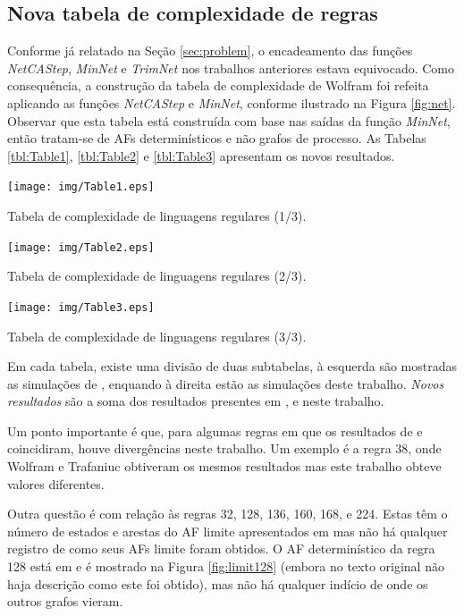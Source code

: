 \documentclass[12pt,a4paper]{article}
\begin{document}
\subsection{Nova tabela de complexidade de regras}\label{sec:table}

Conforme já relatado na Seção \ref{sec:problem}, o encadeamento das
funções \emph{NetCAStep}, \emph{MinNet} e \emph{TrimNet} nos trabalhos anteriores estava
equivocado. Como consequência, a construção da tabela de complexidade
de Wolfram foi refeita aplicando as funções \emph{NetCAStep} e
\emph{MinNet}, conforme ilustrado na Figura \ref{fig:net}. Observar que esta
tabela está construída com base nas saídas da função \emph{MinNet}, então
tratam-se de AFs determinísticos e não grafos de processo.
As Tabelas \ref{tbl:Table1}, \ref{tbl:Table2} e \ref{tbl:Table3}
apresentam os novos resultados.

\begin{table}
\centering
\texttt{[image: img/Table1.eps]}
\caption{Tabela de complexidade de linguagens regulares (1/3).}
\label{tbl:Table1}
\end{table}

\begin{table}
\centering
\texttt{[image: img/Table2.eps]}
\caption{Tabela de complexidade de linguagens regulares (2/3).}
\label{tbl:Table2}
\end{table}

\begin{table}
\centering
\texttt{[image: img/Table3.eps]}
\caption{Tabela de complexidade de linguagens regulares (3/3).}
\label{tbl:Table3}
\end{table}

Em cada tabela, existe uma divisão de duas subtabelas, à esquerda são
mostradas as simulações de , enquando à direita
estão as simulações deste trabalho. \textit{Novos resultados} são a soma
dos resultados presentes em , 
e neste trabalho.

Um ponto importante é que, para algumas regras em que os resultados de
 e  coincidiram, houve
divergências neste trabalho. Um exemplo é a regra 38, onde Wolfram e
Trafaniuc obtiveram os mesmos resultados mas este trabalho obteve valores
diferentes.

Outra questão é com relação às regras 32, 128, 136, 160, 168, e 224. Estas têm
o número de estados e arestas do AF limite apresentados em
 mas não há qualquer registro de como seus AFs limite
foram  obtidos. O AF determinístico da regra 128 está
em  e é mostrado na Figura \ref{fig:limit128} (embora
no texto original não haja descrição como este foi obtido), mas
não há qualquer indício de onde os outros grafos vieram.
\end{document}
